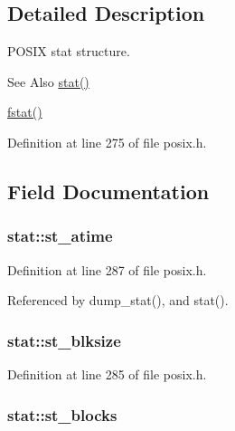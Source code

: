 \subsection{Detailed Description}
P\-O\-S\-I\-X stat structure. 

\begin{DoxySeeAlso}{See Also}
\hyperlink{posix_8c_abef70bf7a4af8a1f4998db0035c51781}{stat()} 

\hyperlink{posix_8h_a85e86e70773c0a204346f965272bd364}{fstat()} 
\end{DoxySeeAlso}


Definition at line 275 of file posix.\-h.



\subsection{Field Documentation}
\hypertarget{structstat_ab74d1e7e345e88b9d0fb2688a97cba64}{
\subsubsection[{st\-\_\-atime}]{ stat\-::st\-\_\-atime}}\label{structstat_ab74d1e7e345e88b9d0fb2688a97cba64}


Definition at line 287 of file posix.\-h.



Referenced by dump\-\_\-stat(), and stat().

\hypertarget{structstat_a38d474e1ae3cf6fbdde89ac3c3e308f1}{
\subsubsection[{st\-\_\-blksize}]{ stat\-::st\-\_\-blksize}}\label{structstat_a38d474e1ae3cf6fbdde89ac3c3e308f1}


Definition at line 285 of file posix.\-h.

\hypertarget{structstat_a42dd716b2f9234f961d949fc9500eefb}{
\subsubsection[{st\-\_\-blocks}]{ stat\-::st\-\_\-blocks}}\label{structstat_a42dd716b2f9234f961d949fc9500eefb}


